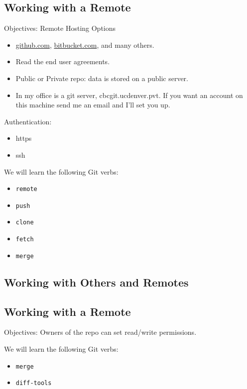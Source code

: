 \subsection{Working with a Remote}
\begin{frame}[t]{Objectives:}
  Remote Hosting Options
  \begin{itemize}
    \item \url{github.com}, \url{bitbucket.com}, and many others.
    \item Read the end user agreements. 
    \item Public or Private repo: data is stored on a public server.
    \item In my office is a git server, cbcgit.ucdenver.pvt.  If you want an
      account on this machine send me an email and I'll set you up.
  \end{itemize}

  Authentication:
  \begin{itemize}
    \item https
    \item ssh
  \end{itemize}

  We will learn the following Git verbs:
  \begin{itemize}
    \item {\tt remote}
    \item {\tt push}
    \item {\tt clone}
    \item {\tt fetch}
    \item {\tt merge}
  \end{itemize} 
\end{frame}

\subsection{Working with Others and Remotes}
\subsection{Working with a Remote}
\begin{frame}[t]{Objectives:}
  Owners of the repo can set read/write permissions.

  We will learn the following Git verbs:
  \begin{itemize}
    \item {\tt merge}
    \item {\tt diff-tools}
  \end{itemize} 
\end{frame}





